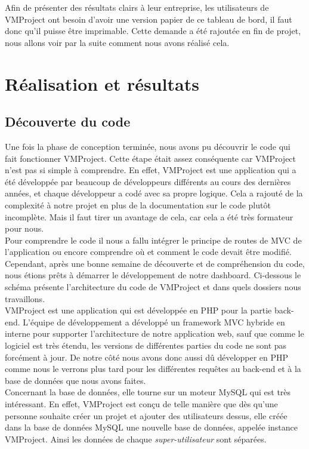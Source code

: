 \documentclass[12pt]{report}
\begin{document}
Afin de présenter des résultats clairs à leur entreprise, les utilisateurs de VMProject ont besoin d’avoir une version papier de ce tableau de bord, il faut donc qu’il puisse être imprimable. Cette demande a été rajoutée en fin de projet, nous allons voir par la suite comment nous avons réalisé cela.

\chapter{Réalisation et résultats}

	\section{Découverte du code}
Une fois la phase de conception terminée, nous avons pu découvrir le code qui fait fonctionner VMProject. Cette étape était assez conséquente car VMProject n’est pas si simple à comprendre. En effet, VMProject est une application qui a été développée par beaucoup de développeurs différents au cours des dernières années, et chaque développeur a codé avec sa propre logique. Cela a rajouté de la complexité à notre projet en plus de la documentation sur le code plutôt incomplète. Mais il faut tirer un avantage de cela, car cela a été très formateur pour nous.\\

 Pour comprendre le code il nous a fallu intégrer le principe de routes de MVC de l'application ou encore comprendre où et comment le code devait être modifié. Cependant, après une bonne semaine de découverte et de compréhension du code, nous étions prêts à démarrer le développement de notre dashboard. Ci-dessous le schéma présente l'architecture du code de VMProject et dans quels dossiers nous travaillons.\\


VMProject est une application qui est développée en PHP pour la partie back-end. L'équipe de développement a développé un framework MVC hybride en interne pour supporter l'architecture de notre application web, sauf que comme le logiciel est très étendu, les versions de différentes parties du code ne sont pas forcément à jour. De notre côté nous avons donc aussi dû développer en PHP comme nous le verrons plus tard pour les différentes requêtes au back-end et à la base de données que nous avons faites.\\

Concernant la base de données, elle tourne sur un moteur MySQL qui est très intéressant. En effet, VMProject est conçu de telle manière que dès qu'une personne souhaite créer un projet et ajouter des utilisateurs dessus, elle créée dans la base de données MySQL une nouvelle base de données, appelée instance VMProject. Ainsi les données de chaque \emph{super-utilisateur} sont séparées.\\
\end{document}
